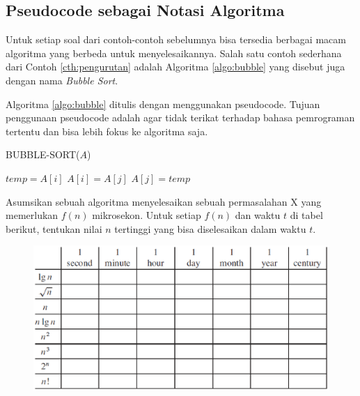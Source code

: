 \subsection{Pseudocode sebagai Notasi Algoritma}
Untuk setiap soal dari contoh-contoh sebelumnya bisa tersedia berbagai macam algoritma yang berbeda untuk menyelesaikannya. Salah satu contoh sederhana dari Contoh \ref{cth:pengurutan} adalah Algoritma \ref{algo:bubble} yang disebut juga dengan nama \textit{Bubble Sort}. 

Algoritma \ref{algo:bubble} ditulis dengan menggunakan pseudocode. Tujuan penggunaan pseudocode adalah agar tidak terikat terhadap bahasa pemrograman tertentu dan bisa lebih fokus ke algoritma saja.

\begin{algorithm}
	\caption{BUBBLE-SORT($A$)}
	\label{algo:bubble}
	\begin{algorithmic}[1]
			\STATE $temp = A[i]$
			\STATE $A[i] = A[j]$
			\STATE $A[j] = temp$
			\ENDIF
		\ENDFOR
	\ENDFOR
	\end{algorithmic}
\end{algorithm}


\begin{konsep}
Asumsikan sebuah algoritma menyelesaikan sebuah permasalahan X yang memerlukan $f(n)$ mikrosekon. Untuk setiap $f(n)$ dan waktu $t$ di tabel berikut, tentukan nilai $n$ tertinggi yang bisa diselesaikan dalam waktu $t$.
\begin{figure}%
\centering
\includegraphics[scale=0.5]{fig/tableEksekusi.eps}%
\end{figure}
\end{konsep}
\newpage
